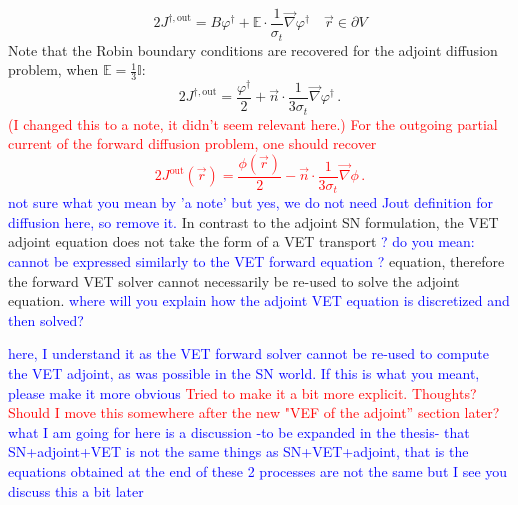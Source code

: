 \documentclass[12pt]{report}
\newcommand{\vr}{\vec{r}}
\newcommand{\grad}{\vec{\nabla}}
\newcommand{\vefadj}{\varphi^\dag}
\newcommand{\bound}{\partial V}
\newcommand{\vn}{\vec{n}}
\newcommand{\Edd}{\mathbb{E}}
\newcommand{\sigt}{\sigma_t}
\newcommand{\comment}[2]{\marginpar{\textcolor{#2}{$\star$}}\textcolor{#2}{#1}\newline}
\newcommand{\iwh}[1]{\comment{#1}{red}}
\newcommand{\jcr}[1]{\comment{#1}{blue}}
\newcommand{\iwh}[1]{\phantom{a}}
\newcommand{\jcr}[1]{\phantom{a}}
\begin{document}
\begin{equation}
\label{adjVETBC}
2J^{\dag,\text{out}} = B \vefadj+ 
\Edd \cdot \frac{1}{\sigma_{t} } \vec{\nabla} \vefadj   \quad \vr \in \bound
\end{equation}
Note that the Robin boundary conditions are recovered for the adjoint diffusion problem, when $\Edd = \tfrac{1}{3} \mathbb{I}$:
\[
2 J^{\dag,\text{out}} = \frac{\vefadj}{2} + \vn \cdot \frac{1}{3\sigt} \grad \vefadj \,.
\]
\iwh{ (I changed this to a note, it didn't seem relevant here.) For the outgoing partial current of the forward diffusion problem, one should recover
\[
2 J^{\text{out}}(\vr) = \frac{\phi(\vr)}{2} \boxed{-} \vn \cdot \frac{1}{3\sigt} \grad \phi \,.
\]}
\jcr{not sure what you mean by 'a note' but yes, we do not need Jout definition for diffusion here, so remove it.}
In contrast to the adjoint SN formulation, the VET adjoint equation does not take the form of a VET transport \jcr{? do you mean: cannot be expressed similarly to the VET forward equation ?} equation, therefore the forward VET solver 
cannot necessarily be re-used to solve the adjoint equation. \jcr{where will you explain how the adjoint VET equation is discretized and then solved?}

\jcr{here, I understand it as the VET forward solver cannot be re-used to compute the VET adjoint,
as was possible in the SN world. If this is what you meant, please make it more obvious}
\iwh{Tried to make it a bit more explicit. Thoughts? Should I move this somewhere after the new "VEF of the adjoint'' section later?} 
\jcr{what I am going for here is a discussion -to be expanded in the thesis- that SN+adjoint+VET is not the same things as SN+VET+adjoint, that is the equations obtained at the end
of these 2 processes are not the same but I see you discuss this a bit later}
\end{document}
